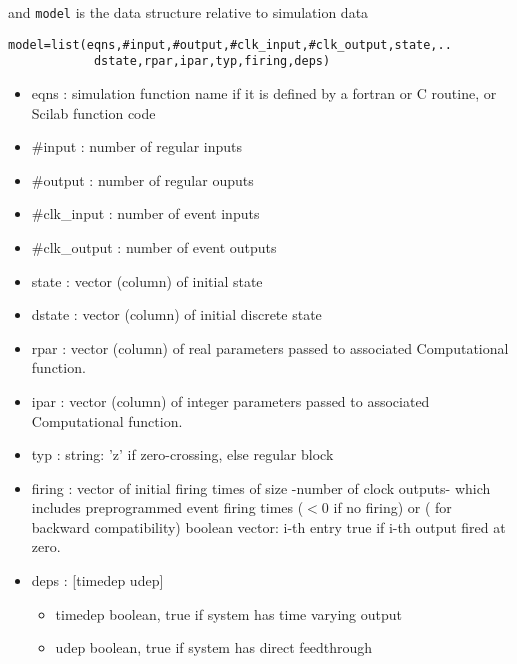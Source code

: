 and {\tt model} is the data structure relative to simulation data
\label{model}
\begin{verbatim}
model=list(eqns,#input,#output,#clk_input,#clk_output,state,..
            dstate,rpar,ipar,typ,firing,deps)
\end{verbatim}
\begin{itemize}
\item eqns : simulation function name if it is defined by a fortran or
  C routine, or Scilab function code
\item \#input : number of regular inputs
\item \#output : number of  regular ouputs
\item \#clk\_input : number of event inputs
\item \#clk\_output : number of event outputs
\item state : vector (column) of initial state
\item dstate : vector (column) of initial discrete state
\item rpar : vector (column) of real parameters passed to associated Computational function.
\item ipar : vector (column) of integer parameters passed to associated Computational function.
\item typ : string: 'z' if zero-crossing, else regular block
\item firing : vector of initial firing times of size -number of clock outputs- which includes
        preprogrammed event firing times ($<$0 if no firing)
        or ( for backward compatibility)
        boolean vector: i-th entry true if i-th output
       fired at zero.  
\item deps : [timedep udep] 
  \begin{itemize}
  \item timedep boolean, true if system has time varying output 
  \item udep boolean, true if system has direct feedthrough
  \end{itemize}
\end{itemize}

